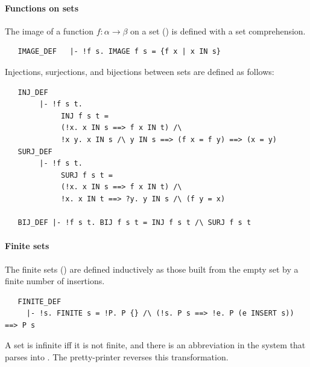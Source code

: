 {\paragraph{Functions on sets}
The image of a function $f :\alpha \to \beta$ on
a set () is defined with a set comprehension.
\begin{hol}
\begin{verbatim}
   IMAGE_DEF   |- !f s. IMAGE f s = {f x | x IN s}
\end{verbatim}
\end{hol}
%
Injections, surjections, and bijections between sets are defined
as follows:
%
\begin{hol}
\begin{verbatim}
   INJ_DEF
        |- !f s t.
             INJ f s t =
             (!x. x IN s ==> f x IN t) /\
             !x y. x IN s /\ y IN s ==> (f x = f y) ==> (x = y)
   SURJ_DEF
        |- !f s t.
             SURJ f s t =
             (!x. x IN s ==> f x IN t) /\
             !x. x IN t ==> ?y. y IN s /\ (f y = x)

   BIJ_DEF |- !f s t. BIJ f s t = INJ f s t /\ SURJ f s t
\end{verbatim}
\end{hol}

\paragraph{Finite sets}
The finite sets () are defined inductively as those
built from the empty set by a finite number of insertions.
%
\begin{hol}
\begin{verbatim}
   FINITE_DEF
     |- !s. FINITE s = !P. P {} /\ (!s. P s ==> !e. P (e INSERT s)) ==> P s
\end{verbatim}
\end{hol}
%
\noindent
A set is infinite iff it is not finite, and there is an abbreviation in the system that parses  into  .
The pretty-printer reverses this transformation.

}
